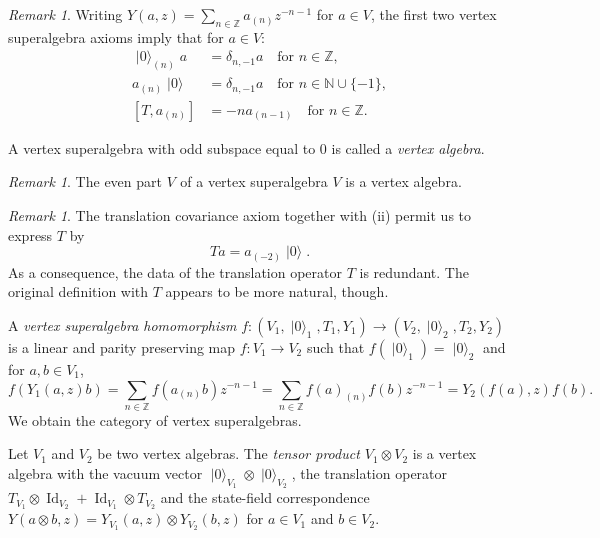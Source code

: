 \documentclass[a4paper, 12pt, reqno]{amsart}
\theoremstyle{remark}
\newtheorem{remark}[theorem]{Remark}
\DeclareMathOperator{\Id}{Id}
\DeclareMathOperator{\vac}{|0\rangle}
\DeclareMathOperator{\zero}{\overline{0}}
\begin{document}
\begin{remark}
  \label{rmk:9}
  Writing $Y(a, z) = \sum_{n \in \mathbb{Z}}a_{(n)}z^{-n - 1}$ for $a \in V$, the first two vertex superalgebra axioms imply that for $a \in V$:
  \begin{align*}
    \vac_{(n)}a &= \delta_{n, -1}a \quad \text{for $n \in \mathbb{Z}$}, \\
    a_{(n)}\vac &= \delta_{n, -1}a \quad \text{for $n \in \mathbb{N} \cup \{-1\}$}, \\
    [T, a_{(n)}] &= -na_{(n - 1)} \quad \text{for $n \in \mathbb{Z}$}.
  \end{align*}
\end{remark}

A vertex superalgebra with odd subspace equal to $0$ is called a \emph{vertex algebra}.

\begin{remark}
  \label{rmk:10}
  The even part $V_{\zero}$ of a vertex superalgebra $V$ is a vertex algebra.
\end{remark}

\begin{remark}
  \label{rmk:11}
  The translation covariance axiom together with (ii) permit us to express $T$ by
  \begin{equation}
    \label{eq:12}
    Ta = a_{(-2)}\vac.
  \end{equation}
  As a consequence, the data of the translation operator $T$ is redundant.
  The original definition with $T$ appears to be more natural, though.
\end{remark}

A \emph{vertex superalgebra homomorphism} $f: (V_1, \vac_1, T_1, Y_1) \to (V_2, \vac_2, T_2, Y_2)$ is a linear and parity preserving map $f: V_1 \to V_2$ such that $f(\vac_1) = \vac_2$ and for $a, b \in V_1$,
\begin{equation*}
  f(Y_1(a, z)b) = \sum_{n \in \mathbb{Z}}f(a_{(n)}b)z^{-n - 1} = \sum_{n \in \mathbb{Z}}f(a)_{(n)}f(b)z^{-n - 1} = Y_2(f(a), z)f(b).
\end{equation*}
We obtain the category of vertex superalgebras.

Let $V_1$ and $V_2$ be two vertex algebras.
The \emph{tensor product $V_1 \otimes V_2$} is a vertex algebra with the vacuum vector $\vac_{V_1}\otimes\vac_{V_2}$, the translation operator $T_{V_1}\otimes\Id_{V_2} + \Id_{V_1}\otimes T_{V_2}$ and the state-field correspondence $Y(a\otimes b, z) = Y_{V_1}(a, z)\otimes Y_{V_2}(b, z)$ for $a \in V_1$ and $b \in V_2$.
\end{document}
